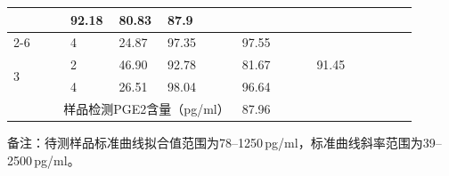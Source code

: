 \documentclass[UTF8,10pt,a4paper,fontset=fandol]{ctexart}
\newcommand{\fieldvalue}[1]{#1}
\newcommand{\handwritten}[1]{#1}
\begin{document}
\begin{tabular}{|p{0.13\linewidth}|p{0.10\linewidth}|p{0.10\linewidth}|p{0.17\linewidth}|p{0.17\linewidth}|p{0.15\linewidth}|p{0.08\linewidth}|}
&
\fieldvalue{\handwritten{92.18}}
&
\fieldvalue{\handwritten{80.83}}
&
\fieldvalue{\handwritten{87.9}}
& \\
\cline{2-6}
&
\fieldvalue{\handwritten{4}}
&
\fieldvalue{\handwritten{24.87}}
&
\fieldvalue{\handwritten{97.35}}
&
\fieldvalue{\handwritten{97.55}}
& & \\
\hline
\multirow{2}{*}{3}
&
\fieldvalue{\handwritten{2}}
&
\fieldvalue{\handwritten{46.90}}
&
\fieldvalue{\handwritten{92.78}}
&
\fieldvalue{\handwritten{81.67}}
&
\fieldvalue{\handwritten{91.45}}
& \\
\cline{2-6}
&
\fieldvalue{\handwritten{4}}
&
\fieldvalue{\handwritten{26.51}}
&
\fieldvalue{\handwritten{98.04}}
&
\fieldvalue{\handwritten{96.64}}
& & \\
\hline
\multicolumn{4}{|r|}{样品检测PGE2含量（pg/ml）} &
\multicolumn{2}{l|}{
\fieldvalue{\handwritten{87.96}}
} & \\
\hline
\end{tabular}

\normalsize

\noindent
备注：待测样品标准曲线拟合值范围为78--1250\,pg/ml，标准曲线斜率范围为39--2500\,pg/ml。
\end{document}
